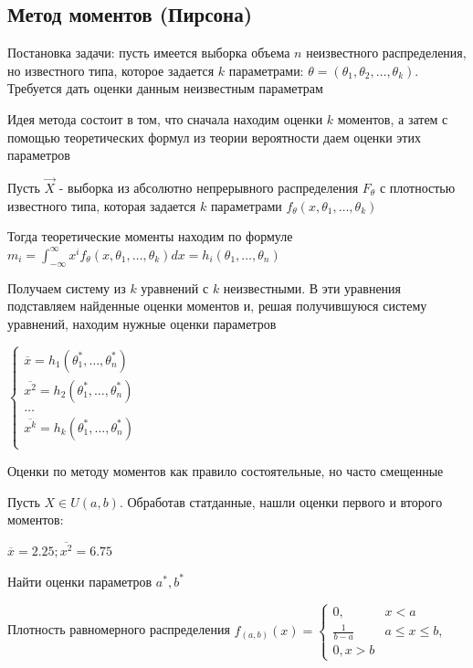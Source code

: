 \documentclass[12pt]{article}
\begin{document}
\subsection{Метод моментов (Пирсона)}

\hypertarget{method_of_moments}{}

Постановка задачи: пусть имеется выборка объема $n$ неизвестного распределения, но известного типа,
которое задается $k$ параметрами: $\theta = (\theta_1, \theta_2, \dots, \theta_k)$. Требуется дать оценки данным
неизвестным параметрам

Идея метода состоит в том, что сначала находим оценки $k$ моментов, а затем с помощью теоретических формул
из теории вероятности даем оценки этих параметров

Пусть $\vec{X}$ - выборка из абсолютно непрерывного распределения $F_\theta$ с плотностью известного типа, 
которая задается $k$ параметрами $f_\theta (x, \theta_1, \dots, \theta_k)$

Тогда теоретические моменты находим по формуле $m_i = \int_{-\infty}^{\infty} x^i f_\theta (x, \theta_1, \dots, \theta_k) dx = h_i(\theta_1, \dots, \theta_n)$

Получаем систему из $k$ уравнений с $k$ неизвестными. В эти уравнения подставляем найденные оценки
моментов и, решая получившуюся систему уравнений, находим нужные оценки параметров

$\begin{cases}
    \overline{x} = h_1(\theta_1^*, \dots, \theta_n^*) \\ 
    \overline{x^2} = h_2(\theta_1^*, \dots, \theta_n^*) \\ 
    \dots \\
    \overline{x^k} = h_k(\theta_1^*, \dots, \theta_n^*) \\ 
\end{cases}$

\Nota Оценки по методу моментов как правило состоятельные, но часто смещенные

\Ex Пусть $X \in U(a, b)$. Обработав статданные, нашли оценки первого и второго моментов:

$\overline{x} = 2.25; \overline{x^2} = 6.75$

Найти оценки параметров $a^*, b^*$

Плотность равномерного распределения $f_{(a, b)} (x) = \begin{cases}0, & x < a \\ \frac{1}{b - a} & a \leq x \leq b, \\ 0, x > b\end{cases}$
\end{document}
